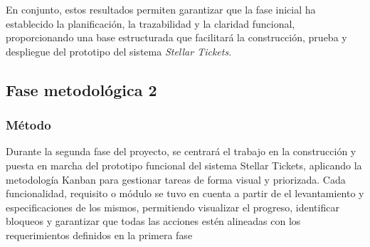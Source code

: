 \documentclass[12pt,a4paper]{article}
\begin{document}
En conjunto, estos resultados permiten garantizar que la fase inicial ha
establecido la planificación, la trazabilidad y la claridad funcional,
proporcionando una base estructurada que facilitará la construcción, prueba y
despliegue del prototipo del sistema \textit{Stellar Tickets}.

\subsection{Fase metodológica 2}
\subsubsection{Método}
Durante la segunda fase del proyecto, se centrará el trabajo en la construcción y puesta en marcha del prototipo funcional del sistema Stellar Tickets, aplicando la metodología Kanban para gestionar tareas de forma visual y priorizada. Cada funcionalidad, requisito o módulo se tuvo en cuenta a partir de el levantamiento y especificaciones de los mismos, permitiendo visualizar el progreso, identificar bloqueos y garantizar que todas las acciones estén alineadas con los requerimientos definidos en la primera fase
\end{document}
